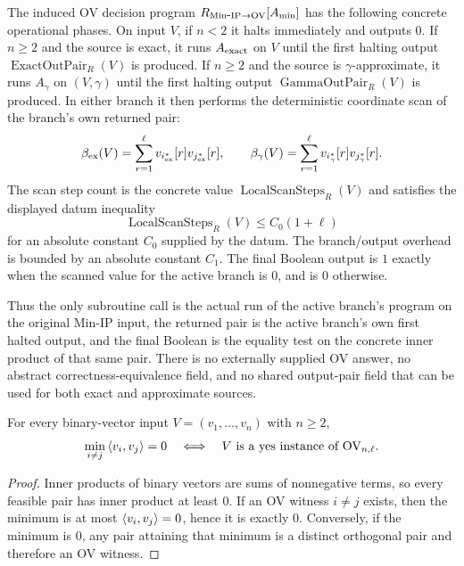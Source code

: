\begin{definition}
  The induced OV decision program
  $R_{\mathrm{Min\mbox{-}IP}\to\mathrm{OV}}[A_{\min}]$ has the following concrete operational phases.
  On input $V$, if $n<2$ it halts immediately and outputs $0$.  If
  $n\geq2$ and the source is exact, it runs $A_{\rm exact}$ on $V$ until the
  first halting output $\operatorname{ExactOutPair}_R(V)$ is produced.  If
  $n\geq2$ and the source is $\gamma$-approximate, it runs $A_{\gamma}$ on
  $(V,\gamma)$ until the first halting output
  $\operatorname{GammaOutPair}_R(V)$ is produced.  In either branch it then
  performs the deterministic coordinate scan of the branch's own returned pair:
  \[
    \beta_{\rm ex}(V)
      =\sum_{r=1}^{\ell}v_{i^*_{\rm ex}}[r]v_{j^*_{\rm ex}}[r],
    \qquad
    \beta_{\gamma}(V)
      =\sum_{r=1}^{\ell}v_{i^*_{\gamma}}[r]v_{j^*_{\gamma}}[r].
  \]
  The scan step count is the concrete value
  $\operatorname{LocalScanSteps}_R(V)$ and satisfies the displayed datum
  inequality
  \[
    \operatorname{LocalScanSteps}_R(V)\leq C_0(1+\ell)
  \]
  for an absolute constant $C_0$ supplied by the datum.  The branch/output
  overhead is bounded by an absolute constant $C_1$.  The final Boolean output
  is $1$ exactly when the scanned value for the active branch is $0$, and is
  $0$ otherwise.

  Thus the only subroutine call is the actual run of the active branch's
  program on the original Min-IP input, the returned pair is the active
  branch's own first halted output, and the final Boolean is the equality test
  on the concrete inner product of that same pair.  There is no externally
  supplied OV answer, no abstract correctness-equivalence field, and no
  shared output-pair field that can be used for both exact and approximate
  sources.
\end{definition}

\begin{lemma}
  \label{lem:minip-optimum-zero-iff-ov}
  For every binary-vector input $V=(v_1,\ldots,v_n)$ with $n\geq2$,
  \[
    \min_{i\neq j}\left\langle v_i,v_j\right\rangle=0
    \quad\Longleftrightarrow\quad
    V\text{ is a yes instance of }\mathrm{OV}_{n,\ell}.
  \]
\end{lemma}
\begin{proof}
  Inner products of binary vectors are sums of nonnegative terms, so every
  feasible pair has inner product at least $0$.  If an OV witness
  $i\neq j$ exists, then the minimum is at most $\left\langle v_i,v_j\right\rangle=0$, hence it is
  exactly $0$.  Conversely, if the minimum is $0$, any pair attaining that
  minimum is a distinct orthogonal pair and therefore an OV witness.
\end{proof}

